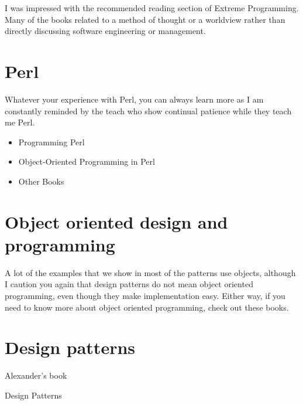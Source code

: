     
I was impressed with the recommended reading section of Extreme
Programming.  Many of the books related to a method of thought
or a worldview rather than directly discussing software engineering
or management.

    \section{Perl}
    
Whatever your experience with Perl, you can always learn more as
I am constantly reminded by the teach who show continual patience 
while they teach me Perl.

        \begin{itemize}
        \item
        Programming Perl
        \item
        Object-Oriented Programming in Perl
        \item
        Other Books
        \end{itemize}

        \section{Object oriented design and programming}
        
A lot of the examples that we show in most of the patterns use 
objects, although I caution you again that design patterns do
not mean object oriented programming, even though they make
implementation easy. Either way, if you need to know more about 
object oriented programming, check out these books.

        \section{Design patterns}
        
        Alexander's book
        
        Design Patterns
        
